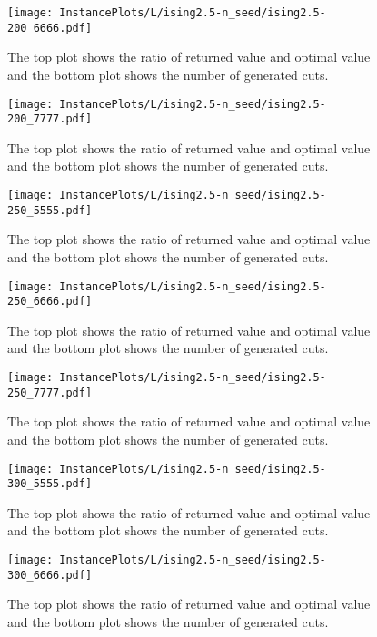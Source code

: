 \documentclass[10pt,a4paper]{article}
\begin{document}
\begin{figure}[H]
\texttt{[image: InstancePlots/L/ising2.5-n\_seed/ising2.5-200\_6666.pdf]}
\caption{The top plot shows the ratio of returned value and optimal value     and the bottom plot shows the number of generated cuts.}
\end{figure}

\begin{figure}[H]
\texttt{[image: InstancePlots/L/ising2.5-n\_seed/ising2.5-200\_7777.pdf]}
\caption{The top plot shows the ratio of returned value and optimal value     and the bottom plot shows the number of generated cuts.}
\end{figure}

\begin{figure}[H]
\texttt{[image: InstancePlots/L/ising2.5-n\_seed/ising2.5-250\_5555.pdf]}
\caption{The top plot shows the ratio of returned value and optimal value     and the bottom plot shows the number of generated cuts.}
\end{figure}

\begin{figure}[H]
\texttt{[image: InstancePlots/L/ising2.5-n\_seed/ising2.5-250\_6666.pdf]}
\caption{The top plot shows the ratio of returned value and optimal value     and the bottom plot shows the number of generated cuts.}
\end{figure}

\begin{figure}[H]
\texttt{[image: InstancePlots/L/ising2.5-n\_seed/ising2.5-250\_7777.pdf]}
\caption{The top plot shows the ratio of returned value and optimal value     and the bottom plot shows the number of generated cuts.}
\end{figure}

\begin{figure}[H]
\texttt{[image: InstancePlots/L/ising2.5-n\_seed/ising2.5-300\_5555.pdf]}
\caption{The top plot shows the ratio of returned value and optimal value     and the bottom plot shows the number of generated cuts.}
\end{figure}

\begin{figure}[H]
\texttt{[image: InstancePlots/L/ising2.5-n\_seed/ising2.5-300\_6666.pdf]}
\caption{The top plot shows the ratio of returned value and optimal value     and the bottom plot shows the number of generated cuts.}
\end{figure}
\end{document}
